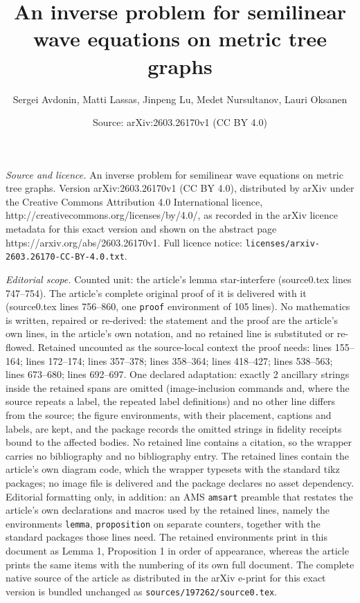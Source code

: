 \documentclass[10pt,a4paper]{amsart}
\title{An inverse problem for semilinear wave equations on metric tree graphs}
\author{Sergei Avdonin, Matti Lassas, Jinpeng Lu, Medet Nursultanov, Lauri Oksanen}
\date{Source: arXiv:2603.26170v1 (CC BY 4.0)}
\begin{document}
\maketitle

\noindent\emph{Source and licence.} An inverse problem for semilinear wave equations on metric tree graphs. Version arXiv:2603.26170v1 (CC BY 4.0), distributed by arXiv under the Creative Commons Attribution 4.0 International licence, http://creativecommons.org/licenses/by/4.0/, as recorded in the arXiv licence metadata for this exact version and shown on the abstract page https://arxiv.org/abs/2603.26170v1. Full licence notice: \texttt{licenses/arxiv-2603.26170-CC-BY-4.0.txt}.\par\smallskip

\noindent\textit{Editorial scope.} Counted unit: the article's lemma star-interfere (source0.tex lines 747--754). The article's complete original proof of it is delivered with it (source0.tex lines 756--860, one \texttt{proof} environment of 105 lines). No mathematics is written, repaired or re-derived: the statement and the proof are the article's own lines, in the article's own notation, and no retained line is substituted or re-flowed.  Retained uncounted as the source-local context the proof needs: lines 155--164; lines 172--174; lines 357--378; lines 358--364; lines 418--427; lines 538--563; lines 673--680; lines 692--697.  One declared adaptation: exactly 2 ancillary strings inside the retained spans are omitted (image-inclusion commands and, where the source repeats a label, the repeated label definitions) and no other line differs from the source; the figure environments, with their placement, captions and labels, are kept, and the package records the omitted strings in fidelity receipts bound to the affected bodies.  No retained line contains a citation, so the wrapper carries no bibliography and no bibliography entry.  The retained lines contain the article's own diagram code, which the wrapper typesets with the standard tikz packages; no image file is delivered and the package declares no asset dependency.  Editorial formatting only, in addition: an AMS \texttt{amsart} preamble that restates the article's own declarations and macros used by the retained lines, namely the environments \texttt{lemma}, \texttt{proposition} on separate counters, together with the standard packages those lines need.  The retained environments print in this document as Lemma 1, Proposition 1 in order of appearance, whereas the article prints the same items with the numbering of its own full document.  The complete native source of the article as distributed in the arXiv e-print for this exact version is bundled unchanged as \texttt{sources/197262/source0.tex}.
\end{document}
